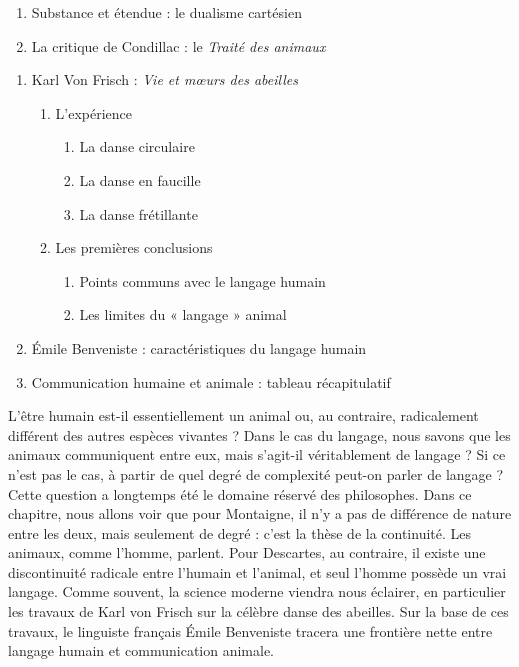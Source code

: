 \begin{enumerate}[label=\arabic*.]
\item Substance et étendue : le dualisme cartésien
\item La critique de Condillac : le \textit{Traité des animaux}
\end{enumerate}
\begin{enumerate}[label=\arabic*.]
\item Karl Von Frisch : \textit{Vie et mœurs des abeilles}
\begin{enumerate}[label=\textbf{\arabic*},nosep]
\item L’expérience
\begin{enumerate}[label=\arabic*.]
\item La danse circulaire
\item La danse en faucille
\item La danse frétillante
\end{enumerate}
\item Les premières conclusions
\begin{enumerate}[label=\arabic*.]
\item Points communs avec le langage humain
\item Les limites du « langage » animal
\end{enumerate}
\end{enumerate}
\item Émile Benveniste : caractéristiques du langage humain
\item Communication humaine et animale : tableau récapitulatif
\end{enumerate}
\endgroup
\par\bigskip
{}
L’être humain est-il essentiellement un animal ou, au contraire, radicalement différent des autres espèces vivantes ? Dans le cas du langage, nous savons que les animaux communiquent entre eux, mais s’agit-il véritablement de langage ? Si ce n’est pas le cas, à partir de quel degré de complexité peut-on parler de langage ? Cette question a longtemps été le domaine réservé des philosophes. Dans ce chapitre, nous allons voir que pour Montaigne, il n’y a pas de différence de nature entre les deux, mais seulement de degré : c’est la thèse de la continuité. Les animaux, comme l’homme, parlent. Pour Descartes, au contraire, il existe une discontinuité radicale entre l’humain et l’animal, et seul l’homme possède un vrai langage. Comme souvent, la science moderne viendra nous éclairer, en particulier les travaux de Karl von Frisch sur la célèbre danse des abeilles. Sur la base de ces travaux, le linguiste français Émile Benveniste tracera une frontière nette entre langage humain et communication animale.
